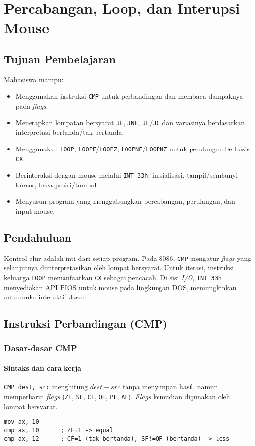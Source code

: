 \documentclass[../main.tex]{subfiles}
\begin{document}
\chapter{Percabangan, Loop, dan Interupsi Mouse}

\section{Tujuan Pembelajaran}
Mahasiswa mampu:
\begin{itemize}
    \item Menggunakan instruksi \texttt{CMP} untuk perbandingan dan membaca dampaknya pada \textit{flags}.
    \item Menerapkan lompatan bersyarat \texttt{JE}, \texttt{JNE}, \texttt{JL}/\texttt{JG} dan variasinya berdasarkan interpretasi bertanda/tak bertanda.
    \item Menggunakan \texttt{LOOP}, \texttt{LOOPE}/\texttt{LOOPZ}, \texttt{LOOPNE}/\texttt{LOOPNZ} untuk perulangan berbasis \texttt{CX}.
    \item Berinteraksi dengan mouse melalui \texttt{INT 33h}: inisialisasi, tampil/sembunyi kursor, baca posisi/tombol.
    \item Menyusun program yang menggabungkan percabangan, perulangan, dan input mouse.
\end{itemize}

\section{Pendahuluan}
Kontrol alur adalah inti dari setiap program. Pada 8086, \texttt{CMP} mengatur \textit{flags} yang selanjutnya diinterpretasikan oleh lompat bersyarat. Untuk iterasi, instruksi keluarga \texttt{LOOP} memanfaatkan \texttt{CX} sebagai pencacah. Di sisi \textit{I/O}, \texttt{INT 33h} menyediakan API BIOS untuk mouse pada lingkungan DOS, memungkinkan antarmuka interaktif dasar.

\section{Instruksi Perbandingan (CMP)}
\subsection{Dasar-dasar CMP}
\subsubsection{Sintaks dan cara kerja}
\texttt{CMP dest, src} menghitung \(dest - src\) tanpa menyimpan hasil, namun memperbarui \textit{flags} (\texttt{ZF}, \texttt{SF}, \texttt{CF}, \texttt{OF}, \texttt{PF}, \texttt{AF}). \textit{Flags} kemudian digunakan oleh lompat bersyarat.
\begin{verbatim}
mov ax, 10
cmp ax, 10      ; ZF=1 -> equal
cmp ax, 12      ; CF=1 (tak bertanda), SF!=OF (bertanda) -> less
\end{verbatim}
\end{document}
